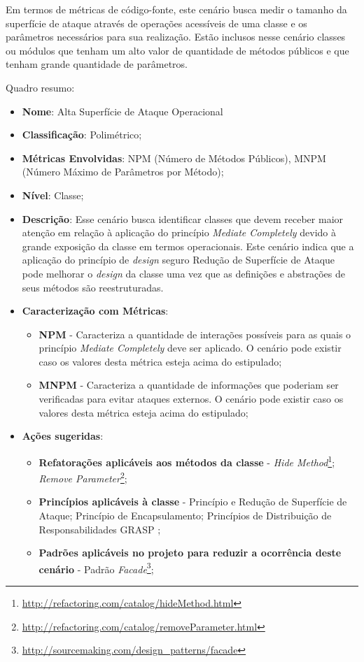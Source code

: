 %

Em termos de métricas de código-fonte, este cenário busca medir o tamanho da superfície de ataque através de operações acessíveis de uma classe e os parâmetros necessários para sua realização. Estão inclusos nesse cenário classes ou módulos que tenham um alto valor de quantidade de métodos públicos e que tenham grande quantidade de parâmetros. 

%

Quadro resumo:

\begin{itemize}
\item \textbf{Nome}: Alta Superfície de Ataque Operacional
\item \textbf{Classificação}: Polimétrico;
\item \textbf{Métricas Envolvidas}: NPM (Número de Métodos Públicos), MNPM (Número Máximo de Parâmetros por Método); 
\item \textbf{Nível}: Classe;
\item \textbf{Descrição}: Esse cenário busca identificar classes que devem receber maior atenção em relação à aplicação do princípio \emph{Mediate Completely} devido à grande exposição da classe em termos operacionais. Este cenário indica que a aplicação do princípio de \emph{design} seguro Redução de Superfície de Ataque pode melhorar o \emph{design} da classe uma vez que as definições e abstrações de seus métodos são reestruturadas.
\item \textbf{Caracterização com Métricas}: 
	\begin{itemize}
	\item \textbf{NPM} - Caracteriza a quantidade de interações possíveis para as quais o princípio \emph{Mediate Completely} deve ser aplicado. O cenário pode existir caso os valores desta métrica esteja acima do estipulado;
	\item \textbf{MNPM} - Caracteriza a quantidade de informações que poderiam ser verificadas para evitar ataques externos. O cenário pode existir caso os valores desta métrica esteja acima do estipulado; 
	\end{itemize}
\item \textbf{Ações sugeridas}: 
	\begin{itemize}
	\item \textbf{Refatorações aplicáveis aos métodos da classe} - \emph{Hide Method}\footnote{\url{http://refactoring.com/catalog/hideMethod.html}}; \emph{Remove Parameter}\footnote{\url{http://refactoring.com/catalog/removeParameter.html}};
	\item \textbf{Princípios aplicáveis à classe} - Princípio e Redução de Superfície de Ataque; Princípio de Encapsulamento; Princípios de Distribuição de Responsabilidades GRASP \cite{larman2007};
	\item \textbf{Padrões aplicáveis no projeto para reduzir a ocorrência deste cenário} - Padrão \emph{Facade}\footnote{\url{http://sourcemaking.com/design_patterns/facade}};
	\end{itemize}
\end{itemize}

